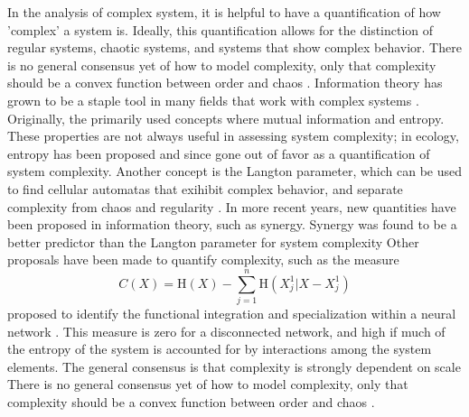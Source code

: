 \documentclass[../main.tex]{subfiles}
\begin{document}
In the analysis of complex system, it is helpful to have a quantification of how 'complex' a system is.
Ideally, this quantification allows for the distinction of regular systems, chaotic systems, and systems that show complex behavior.
There is no general consensus yet of how to model complexity, only that complexity should be a convex function between order and chaos \cite{bar2013computationally}.
Information theory has grown to be a staple tool in many fields that work with complex systems \cite{williams2010nonnegative}. %
Originally, the primarily used concepts where mutual information and entropy.
These properties are not always useful in assessing system complexity; in ecology, entropy has been proposed and since gone out of favor as a quantification of system complexity.
Another concept is the Langton parameter, which can be used to find cellular automatas that exihibit complex behavior, and separate complexity from chaos and regularity \cite{langton1990computation}.
In more recent years, new quantities have been proposed in information theory, such as synergy.
Synergy was found to be a better predictor than the Langton parameter for system complexity \cite{9999QuaxChli}
Other proposals have been made to quantify complexity, such as the measure
%
\begin{equation}
C(X) = \mathrm{H}(X) - \sum_{j=1}^n \mathrm{H}(X_j^1 | X - X_j^1)
\end{equation}
%
proposed to identify the functional integration and specialization within a neural network \cite{tononi1999measures}. This measure is zero for a disconnected network, and high if much of the entropy of the system is accounted for by interactions among the system elements.
The general consensus is that complexity is strongly dependent on scale 
There is no general consensus yet of how to model complexity, only that complexity should be a convex function between order and chaos \cite{bar2013computationally}.
\end{document}
